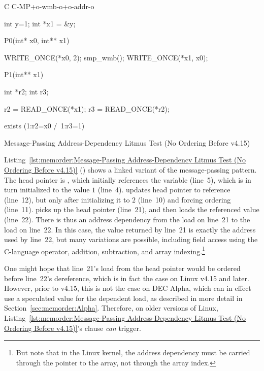 \begin{listing}[tbp]
{ \scriptsize
\begin{verbbox}[\LstLineNo]
C C-MP+o-wmb-o+o-addr-o

{
int y=1;
int *x1 = &y;
}

P0(int* x0, int** x1) {

  WRITE_ONCE(*x0, 2);
  smp_wmb();
  WRITE_ONCE(*x1, x0);

}

P1(int** x1) {

  int *r2;
  int r3;

  r2 = READ_ONCE(*x1);
  r3 = READ_ONCE(*r2);

}

exists (1:r2=x0 /\ 1:r3=1)
\end{verbbox}
}
\centering
\theverbbox
\caption{Message-Passing Address-Dependency Litmus Test (No Ordering Before v4.15)}
\label{lst:memorder:Message-Passing Address-Dependency Litmus Test (No Ordering Before v4.15)}
\end{listing}

Listing~\ref{lst:memorder:Message-Passing Address-Dependency Litmus Test (No Ordering Before v4.15)}
()
shows a linked variant of the message-passing pattern.
The head pointer is , which initially
references the  variable  (line~5), which is in turn
initialized to the value $1$ (line~4).
 updates head pointer  to reference  (line~12),
but only after initializing it to $2$ (line~10) and forcing ordering
(line~11).
 picks up the head pointer  (line~21), and then loads
the referenced value (line~22).
There is thus an address dependency from the load on line~21 to the
load on line~22.
In this case, the value returned by line~21 is exactly the address
used by line~22, but many variations are possible,
including field access using the C-language \co{->} operator,
addition, subtraction, and array indexing.\footnote{
	But note that in the Linux kernel, the address dependency must
	be carried through the pointer to the array, not through the
	array index.}

One might hope that line~21's load from the head pointer would be ordered
before line~22's dereference, which is in fact the case on Linux v4.15
and later.
However, prior to v4.15, this is not the case on DEC Alpha, which can
in effect use a speculated value for the dependent load, as described
in more detail in Section~\ref{sec:memorder:Alpha}.
Therefore, on older versions of Linux,
Listing~\ref{lst:memorder:Message-Passing Address-Dependency Litmus Test (No Ordering Before v4.15)}'s
 clause \emph{can} trigger.


